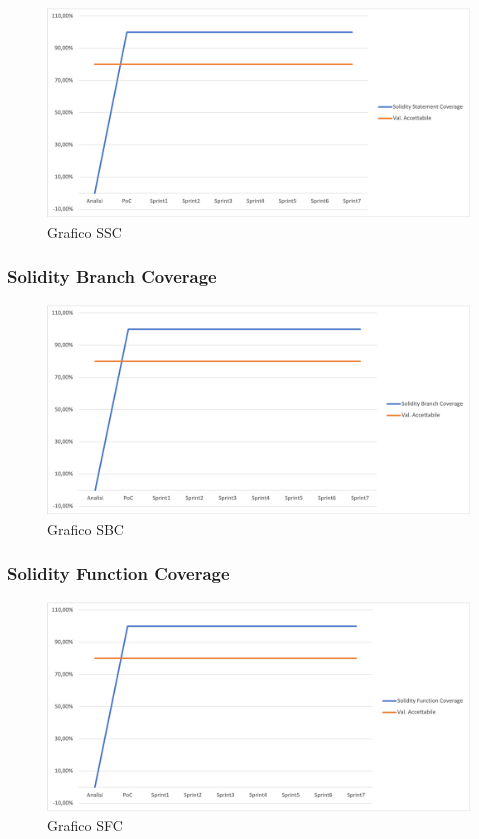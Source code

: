\begin{figure}[H]
\centering
\includegraphics[width=1\textwidth]{src/img/Solidity Statement Coverage.png}
\caption{Grafico SSC}
\end{figure}

\subsubsection{Solidity Branch Coverage}

\begin{figure}[H]
\centering
\includegraphics[width=1\textwidth]{src/img/Solidity Branch Coverage.png}
\caption{Grafico SBC}
\end{figure}

\subsubsection{Solidity Function Coverage}

\begin{figure}[H]
\centering
\includegraphics[width=1\textwidth]{src/img/Solidity Function Coverage.png}
\caption{Grafico SFC}
\end{figure}

